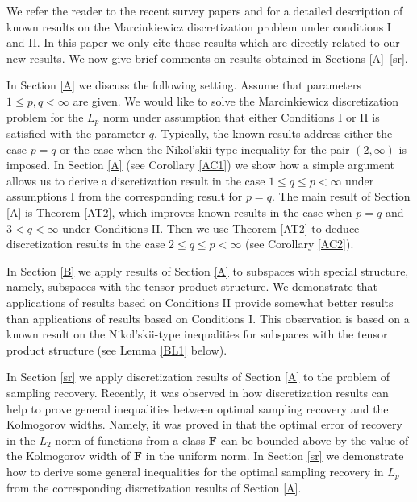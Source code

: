 \documentclass[12pt]{article}
\def\bF{\mathbf F}
\numberwithin{equation}{section}
\begin{document}
We refer the reader to the recent survey papers \cite{DPTT} and \cite{KKLT} for a detailed 
description of known results on the Marcinkiewicz discretization problem under conditions I and II. 
In this paper we only cite those results which are directly related to our new results. We now give 
brief comments on results obtained in Sections \ref{A}--\ref{sr}. 

In Section \ref{A} we discuss the following setting. Assume that parameters $1\le p,q <\infty$ are given. We would like to solve the Marcinkiewicz discretization problem for the $L_p$ norm under assumption that either Conditions I or II is satisfied with the parameter $q$. Typically, the known results 
address either the case $p=q$ or the case when the Nikol'skii-type inequality for the pair $(2,\infty)$ is imposed. In Section \ref{A} (see Corollary \ref{AC1}) we show how a simple argument allows us to derive a discretization result in the case $1\le q\le p<\infty$ under assumptions I from the corresponding result for $p=q$. The main result of Section \ref{A} is Theorem \ref{AT2}, which 
improves known results in the case when  $p=q$ and  $3<q<\infty$ under Conditions II. Then we use 
Theorem \ref{AT2} to  deduce  discretization results in the case $2\le q\le p <\infty$ (see Corollary \ref{AC2}). 

In Section \ref{B} we apply results of Section \ref{A} to subspaces with special structure, namely,
subspaces with the tensor product structure. We demonstrate that applications of results based on 
Conditions II provide somewhat better results than applications of results based on 
Conditions I. This observation is based on a known result on the Nikol'skii-type inequalities for subspaces with the tensor product structure (see Lemma \ref{BL1} below).

In Section \ref{sr} we apply discretization results of Section \ref{A} to the problem of sampling recovery. Recently, it was observed in \cite{VT183} how discretization results can help to prove 
general inequalities between optimal sampling recovery and the Kolmogorov widths. Namely,
it was proved in \cite{VT183} that the optimal error of recovery in the $L_2$ norm of functions from a class $\bF$ can be bounded above by the value of the Kolmogorov width of $\bF$ in the uniform norm. In Section \ref{sr} we demonstrate how to derive some general inequalities for the optimal sampling recovery in $L_p$ from the corresponding discretization results of Section \ref{A}. 
\end{document}
